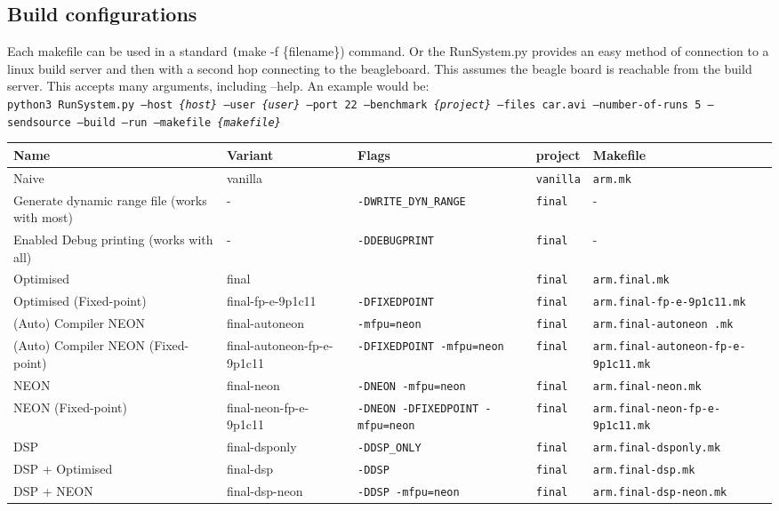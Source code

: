 \documentclass[final]{article} %
\begin{document}
\begin{appendices}
\section{Build configurations}
Each makefile can be used in a standard \texttt(make -f \{filename\}) command.
Or the RunSystem.py provides an easy method of connection to a linux build server and then with a second hop connecting to the beagleboard. 
This assumes the beagle board is reachable from the build server.
This accepts many arguments, including --help.
An example would be:\\
\texttt{python3 RunSystem.py --host \emph{\{host\}} --user \emph{\{user\}} --port 22 --benchmark \emph{\{project\}} --files car.avi --number-of-runs 5 --sendsource --build --run --makefile \emph{\{makefile\}}}
\begin{table}[H]
	\centering
	\begin{tabular}{>{\raggedright}p{2.5cm}>{\raggedright}p{2cm}>{\raggedright}p{3cm}lp{3cm}}
	\toprule
	\textbf{Name}								& \textbf{Variant}			 & \textbf{Flags}							& \textbf{project}			& \textbf{Makefile}	\\
	\midrule
	Naive										& vanilla 					 & \texttt{}								& \texttt{vanilla}			& \texttt{arm.mk}	\\
	Generate dynamic range file	(works with most)& - 						 & \texttt{-DWRITE\_DYN\_RANGE}				& \texttt{final}	& -	\\
	Enabled Debug printing	(works with all)    & - 						 & \texttt{-DDEBUGPRINT}					& \texttt{final}	& -	\\
	Optimised									& final 					 & \texttt{}								& \texttt{final}	& \texttt{arm.final.mk}	\\
	Optimised (Fixed-point)						& final-fp-e-9p1c11			 & \texttt{-DFIXEDPOINT}	    			& \texttt{final}	& \texttt{arm.final-fp-e-9p1c11.mk}	\\
	(Auto) Compiler NEON						& final-autoneon 			 & \texttt{-mfpu=neon}		    			& \texttt{final}	& \texttt{arm.final-autoneon .mk}	\\
	(Auto) Compiler NEON (Fixed-point)			& final-autoneon-fp-e-9p1c11 & \texttt{-DFIXEDPOINT -mfpu=neon}		    & \texttt{final}	& \texttt{arm.final-autoneon-fp-e-9p1c11.mk}	\\
	NEON										& final-neon 				 & \texttt{-DNEON -mfpu=neon}		    	& \texttt{final}	& \texttt{arm.final-neon.mk}	\\
	NEON (Fixed-point)							& final-neon-fp-e-9p1c11	 & \texttt{-DNEON -DFIXEDPOINT -mfpu=neon}	& \texttt{final}	& \texttt{arm.final-neon-fp-e-9p1c11.mk}	\\
	DSP											& final-dsponly				 & \texttt{-DDSP\_ONLY}						& \texttt{final}	& \texttt{arm.final-dsponly.mk}	\\
	DSP + Optimised								& final-dsp 				 & \texttt{-DDSP}							& \texttt{final}	& \texttt{arm.final-dsp.mk}	\\
	DSP + NEON									& final-dsp-neon 			 & \texttt{-DDSP -mfpu=neon}				& \texttt{final}	& \texttt{arm.final-dsp-neon.mk}	\\
	\bottomrule
	\end{tabular}
\end{table}


\end{appendices}
\end{document}
